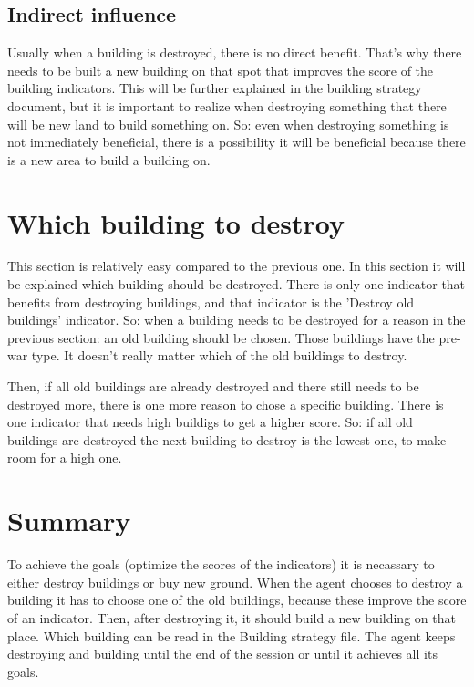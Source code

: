 \documentclass{article}
\begin{document}
\subsection{Indirect influence}
Usually when a building is destroyed, there is no direct benefit. That's why there needs to be built a new building on that spot that improves the score of the building indicators. This will be further explained in the building strategy document, but it is important to realize when destroying something that there will be new land to build something on. So: even when destroying something is not immediately beneficial, there is a possibility it will be beneficial because there is a new area to build a building on.

\section{Which building to destroy}
This section is relatively easy compared to the previous one. In this section it will be explained which building should be destroyed. There is only one indicator that benefits from destroying buildings, and that indicator is the 'Destroy old buildings' indicator. So: when a building needs to be destroyed for a reason in the previous section: an old building should be chosen. Those buildings have the pre-war type. It doesn't really matter which of the old buildings to destroy. 

Then, if all old buildings are already destroyed and there still needs to be destroyed more, there is one more reason to chose a specific building. There is one indicator that needs high buildigs to get a higher score. So: if all old buildings are destroyed the next building to destroy is the lowest one, to make room for a high one.

\section{Summary}
To achieve the goals (optimize the scores of the indicators) it is necassary to either destroy buildings or buy new ground. When the agent chooses to destroy a building it has to choose one of the old buildings, because these improve the score of an indicator. Then, after destroying it, it should build a new building on that place. Which building can be read in the Building strategy file. The agent keeps destroying and building until the end of the session or until it achieves all its goals. 
\end{document}
